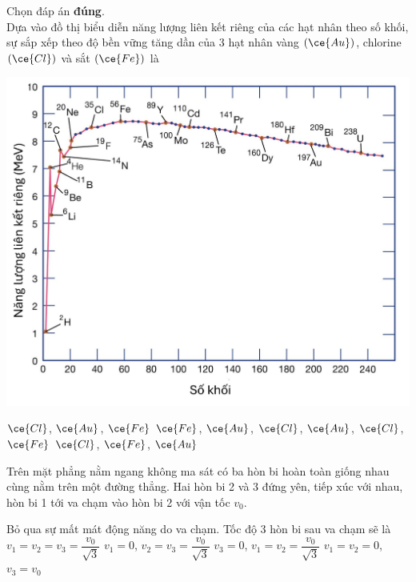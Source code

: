 \begin{ex}
	Chọn đáp án \textbf{đúng}.\\
	Dựa vào đồ thị biểu diễn năng lượng liên kết riêng của các hạt nhân theo số khối, sự sắp xếp theo độ bền vững tăng dần của 3 hạt nhân vàng $\left(\ce{Au}\right)$, chlorine $\left(\ce{Cl}\right)$ và sắt $\left(\ce{Fe}\right)$ là
	\begin{center}
		\includegraphics[width=0.7\linewidth]{../figs/VN12-Y24-PH-SYL-027P-3}
	\end{center}
	\choice
	{$\ce{Cl}$, $\ce{Au}$, $\ce{Fe}$}
	{$\ce{Fe}$, $\ce{Au}$, $\ce{Cl}$, }
	{\True $\ce{Au}$, $\ce{Cl}$, $\ce{Fe}$}
	{$\ce{Cl}$, $\ce{Fe}$, $\ce{Au}$}
	\loigiai{}
\end{ex}
\begin{ex}
	Trên mặt phẳng nằm ngang không ma sát có ba hòn bi hoàn toàn giống nhau cùng nằm trên một đường thẳng. Hai hòn bi 2 và 3 đứng yên, tiếp xúc với nhau, hòn bi 1 tới va chạm vào hòn bi 2 với vận tốc $v_0$. 
	\begin{center}
	\end{center}
	Bỏ qua sự mất mát động năng do va chạm. Tốc độ 3 hòn bi sau va chạm sẽ là
	\choice
	{$v_1=v_2=v_3=\dfrac{v_0}{\sqrt{3}}$}
	{$v_1=0$, $v_2=v_3=\dfrac{v_0}{\sqrt{3}}$}
	{$v_3=0$, $v_1=v_2=\dfrac{v_0}{\sqrt{3}}$}
	{\True $v_1=v_2=0$, $v_3=v_0$}
\end{ex}
